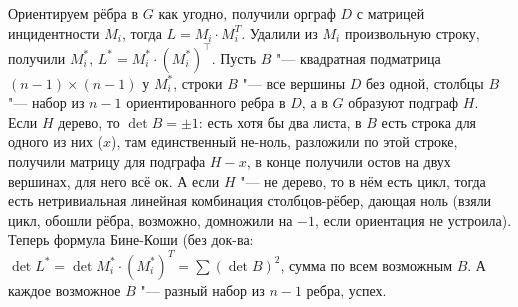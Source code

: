 Ориентируем рёбра в $G$ как угодно, получили орграф $D$ с матрицей инцидентности $M_i$, тогда $L=M_i \cdot M_i^T$.
Удалили из $M_i$ произвольную строку, получили $M_i^*$, $L^*=M_i^*\cdot (M_i^*)^\top$.
Пусть $B$ "--- квадратная подматрица $(n-1)\times(n-1)$ у $M_i^*$, строки $B$ "--- все вершины $D$ без одной, столбцы $B$ "--- набор из $n-1$
ориентированного ребра в $D$, а в $G$ образуют подграф $H$.
Если $H$ дерево, то $\det B = \pm 1$: есть хотя бы два листа, в $B$ есть строка для одного из них ($x$),
там единственный не-ноль, разложили по этой строке, получили матрицу для подграфа $H-x$, в конце получили остов на двух вершинах,
для него всё ок.
А если $H$ "--- не дерево, то в нём есть цикл, тогда есть нетривиальная линейная комбинация столбцов-рёбер, дающая ноль
(взяли цикл, обошли рёбра, возможно, домножили на $-1$, если ориентация не устроила).
Теперь формула Бине-Коши (без док-ва: $\det L^* = \det M_i^* \cdot (M_i^*)^T = \sum (\det B)^2$, сумма по всем возможным $B$.
А каждое возможное $B$ "--- разный набор из $n-1$ ребра, успех.

\section{} %

\section{} %
